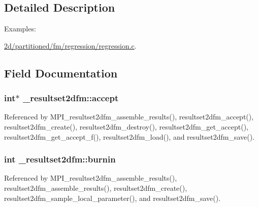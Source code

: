 \subsection{Detailed Description}
\begin{Desc}
\item[Examples\+: ]\par
\hyperlink{2d_2partitioned_2fm_2regression_2regression_8c-example}{2d/partitioned/fm/regression/regression.\+c}.\end{Desc}


\subsection{Field Documentation}
\subsubsection[{\texorpdfstring{accept}{accept}}]{\setlength{\rightskip}{0pt plus 5cm}int$\ast$ \+\_\+resultset2dfm\+::accept}\hypertarget{struct__resultset2dfm_a5856aafd834dbba8fdea6fe34eecb196}{}\label{struct__resultset2dfm_a5856aafd834dbba8fdea6fe34eecb196}


Referenced by M\+P\+I\+\_\+resultset2dfm\+\_\+assemble\+\_\+results(), resultset2dfm\+\_\+accept(), resultset2dfm\+\_\+create(), resultset2dfm\+\_\+destroy(), resultset2dfm\+\_\+get\+\_\+accept(), resultset2dfm\+\_\+get\+\_\+accept\+\_\+f(), resultset2dfm\+\_\+load(), and resultset2dfm\+\_\+save().

\subsubsection[{\texorpdfstring{burnin}{burnin}}]{\setlength{\rightskip}{0pt plus 5cm}int \+\_\+resultset2dfm\+::burnin}\hypertarget{struct__resultset2dfm_a6b8c999bec94e86b0ddeb2ed0dd32340}{}\label{struct__resultset2dfm_a6b8c999bec94e86b0ddeb2ed0dd32340}


Referenced by M\+P\+I\+\_\+resultset2dfm\+\_\+assemble\+\_\+results(), resultset2dfm\+\_\+assemble\+\_\+results(), resultset2dfm\+\_\+create(), resultset2dfm\+\_\+sample\+\_\+local\+\_\+parameter(), and resultset2dfm\+\_\+save().

